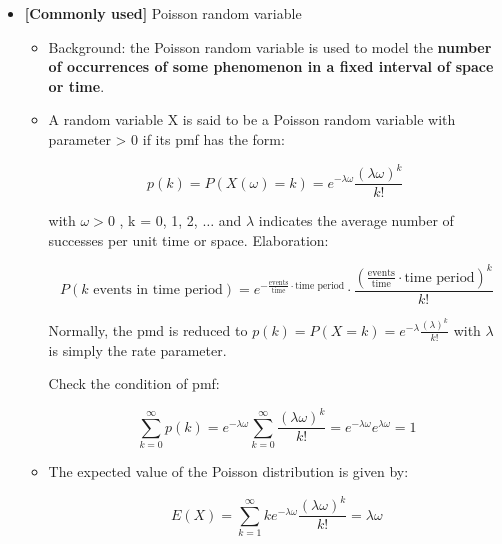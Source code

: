 \documentclass[12pt]{report}
\renewcommand{\_}{\kern-1.5pt\textunderscore\kern-1.5pt}
\begin{document}
\begin{itemize}
	\item \textbf{[Commonly used]} Poisson random variable\par

\begin{itemize}
	\item Background: the Poisson random variable is used to model the \textbf{number of occurrences of some phenomenon in a fixed interval of space or time}. \par

	\item A random variable X is said to be a Poisson random variable with parameter  > 0 if its pmf has the form:\par

 \[ p \left( k \right) =P \left( X \left(  \omega  \right) =k \right) =e^{- \lambda  \omega }\frac{ \left(  \lambda  \omega  \right) ^{k}}{k!}~ \] \par

with  \(  \omega >0 \) , k = 0, 1, 2, $ \ldots $  and  \(  \lambda  \)  indicates the average number of successes per unit time or space. Elaboration: \par

 \[ P \left( k\mathrm{\text{ events in time period}} \right) =e^{-\frac{\mathrm{events}}{\mathrm{time}} \cdot \mathrm{\text{time period}}} \cdot \frac{ \left( \frac{\mathrm{events}}{\mathrm{time}} \cdot \mathrm{\text{time period}} \right) ^{k}}{k!} \] \par

Normally, the pmd is reduced to  \( p \left( k \right) =P \left( X=k \right) =e^{- \lambda }\frac{ \left(  \lambda  \right) ^{k}}{k!} \)  with  \(  \lambda  \)  is simply the rate parameter. \par

Check the condition of pmf:\par

 \[  \sum _{k=0}^{\infty}p \left( k \right) =e^{- \lambda  \omega } \sum _{k=0}^{\infty}\frac{ \left(  \lambda  \omega  \right) ^{k}}{k!}=e^{- \lambda  \omega }e^{ \lambda  \omega }=1 \] \par

	\item The expected value of the Poisson distribution is given by:\par

 \[ E \left( X \right) = \sum _{k=1}^{\infty}ke^{- \lambda  \omega }\frac{ \left(  \lambda  \omega  \right) ^{k}}{k!}= \lambda  \omega  \] \par


\end{itemize}
\end{itemize}
\end{document}
